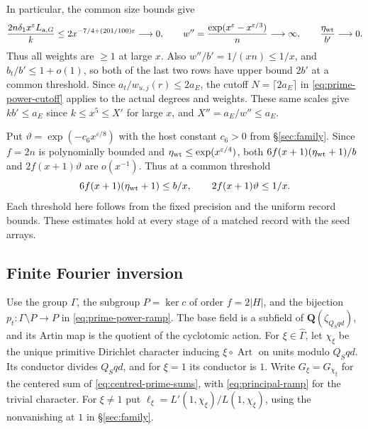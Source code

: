 In particular, the common size bounds give
\[
 \frac{2n\delta_1 x^\varepsilon L_{\mathrm{a},G}}{k}
 \le 2x^{-7/4+(201/100)\varepsilon}\longrightarrow0,\qquad
 w''=\frac{\exp(x^\varepsilon-x^{\varepsilon/3})}{n}\longrightarrow\infty,
 \qquad \frac{\eta_{\rm wt}}{b'}\longrightarrow0 .
\]
Thus all weights are \(\ge1\) at large \(x\). Also \(w''/b'=1/(xn)\le1/x\),
and \(b_t/b'\le1+o(1)\), so both of the last two rows have upper bound
\(2b'\) at a common threshold. Since \(a_t/w_{u,j}(r)\le2a_E\), the
cutoff \(N=\lceil2a_E\rceil\) in \eqref{eq:prime-power-cutoff} applies to
the actual degrees and weights. These same scales give
\(kb'\le a_E\) since \(k\le x^5\le X'\) for large \(x\), and
\(X''=a_E/w''\le a_E\).

Put \(\vartheta=\exp(-c_6x^{\varepsilon/8})\) with the host
constant \(c_6>0\) from \S\ref{sec:family}. Since \(f=2n\) is
polynomially bounded and \(\eta_{\rm wt}\le\exp(x^{\varepsilon/4})\),
both \(6f(x+1)(\eta_{\rm wt}+1)/b\) and \(2f(x+1)\vartheta\) are
\(o(x^{-1})\). Thus at a common threshold
\begin{equation}
\label{eq:fourier-weight-costs}
 6f(x+1)(\eta_{\rm wt}+1)\le b/x,\qquad
 2f(x+1)\vartheta\le1/x .
\end{equation}
Each threshold here follows from the fixed precision and the uniform
record bounds. These estimates hold at every stage of a matched
record with the seed arrays.

\subsection{Finite Fourier inversion}

Use the group \(\Gamma\), the subgroup \(P=\ker c\) of order \(f=2|H|\),
and the bijection \(p_t:\Gamma\setminus P\to P\) in
\eqref{eq:prime-power-ramp}. The base field is a subfield of
\(\mathbf Q(\zeta_{Q_Sqd})\), and its Artin map is the quotient of the
cyclotomic action. For \(\xi\in\widehat\Gamma\), let \(\chi_\xi\) be the
unique primitive Dirichlet character inducing \(\xi\circ\operatorname{Art}\)
on units modulo \(Q_Sqd\). Its conductor divides \(Q_Sqd\), and for
\(\xi=1\) its conductor is \(1\). Write \(G_\xi=G_{\chi_\xi}\) for the
centered sum of \eqref{eq:centred-prime-sums}, with
\eqref{eq:principal-ramp} for the trivial character. For \(\xi\ne1\)
put \(\ell_\xi=L'(1,\chi_\xi)/L(1,\chi_\xi)\), using the nonvanishing
at \(1\) in \S\ref{sec:family}.

